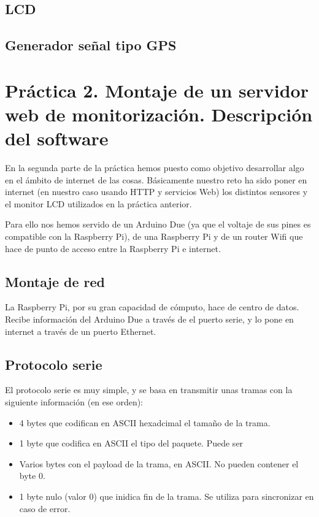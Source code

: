 \documentclass[]{article}
\begin{document}
\subsection{LCD}

\subsection{Generador señal tipo GPS}


\section{Práctica 2. Montaje de un servidor web de monitorización. Descripción del software}

En la segunda parte de la práctica hemos puesto como objetivo desarrollar algo en el ámbito de internet de las cosas. Básicamente nuestro reto ha sido poner en internet (en nuestro caso usando HTTP y servicios Web) los distintos sensores y el monitor LCD utilizados en la práctica anterior.

Para ello nos hemos servido de un Arduino Due (ya que el voltaje de sus pines es compatible con la Raspberry Pi), de una Raspberry Pi y de un router Wifi que hace de punto de acceso entre la Raspberry Pi e internet.

\subsection{Montaje de red}

La Raspberry Pi, por su gran capacidad de cómputo, hace de centro de datos. Recibe información del Arduino Due a través de el puerto serie, y lo pone en internet a través de un puerto Ethernet. 

\subsection{Protocolo serie}

El protocolo serie es muy simple, y se basa en transmitir unas tramas con la siguiente información (en ese orden):

\begin{itemize}
	\item 4 bytes que codifican en ASCII hexadcimal el tamaño de la trama.
	\item 1 byte que codifica en ASCII el tipo del paquete. Puede ser %
	\item Varios bytes con el payload de la trama, en ASCII. No pueden contener el byte 0.
	\item 1 byte nulo (valor 0) que inidica fin de la trama. Se utiliza para sincronizar en caso de error.
\end{itemize}
\end{document}
